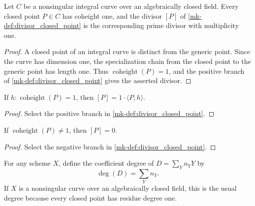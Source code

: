 \begin{lemma}
  \label{mk-lem:curve_closed_point_prime_divisor}

  Let \(C\) be a nonsingular integral curve over an algebraically closed
  field.  Every closed point \(P\in C\) has coheight one, and the divisor
  \([P]\) of \ref{mk-def:divisor_closed_point} is the corresponding prime
  divisor with multiplicity one.
\end{lemma}
\begin{proof}
  A closed point of an integral curve is distinct from the generic point.
  Since the curve has dimension one, the specialization chain from the
  closed point to the generic point has length one.  Thus
  \(\operatorname{coheight}(P)=1\), and the positive branch of
  \ref{mk-def:divisor_closed_point} gives the asserted divisor.
\end{proof}

\begin{lemma}
  \label{mk-lem:ofClosedPoint_eq_single}
  \leanok


  If \(h:\operatorname{coheight}(P)=1\), then
  \([P]=1\cdot\langle P,h\rangle\).
\end{lemma}
\begin{proof}
  \leanok
  Select the positive branch in \ref{mk-def:divisor_closed_point}.
\end{proof}

\begin{lemma}
  \label{mk-lem:ofClosedPoint_eq_zero}
  \leanok


  If \(\operatorname{coheight}(P)\neq1\), then \([P]=0\).
\end{lemma}
\begin{proof}
  \leanok
  Select the negative branch in \ref{mk-def:divisor_closed_point}.
\end{proof}

\begin{definition}
  \label{mk-def:divisor_degree}
  \leanok


  For any scheme \(X\), define the coefficient degree of
  \(D=\sum_Y n_YY\) by
  \[
    \deg(D)=\sum_Y n_Y.
  \]
  If \(X\) is a nonsingular curve over an algebraically closed field, this
  is the usual degree because every closed point has residue degree one.
\end{definition}

